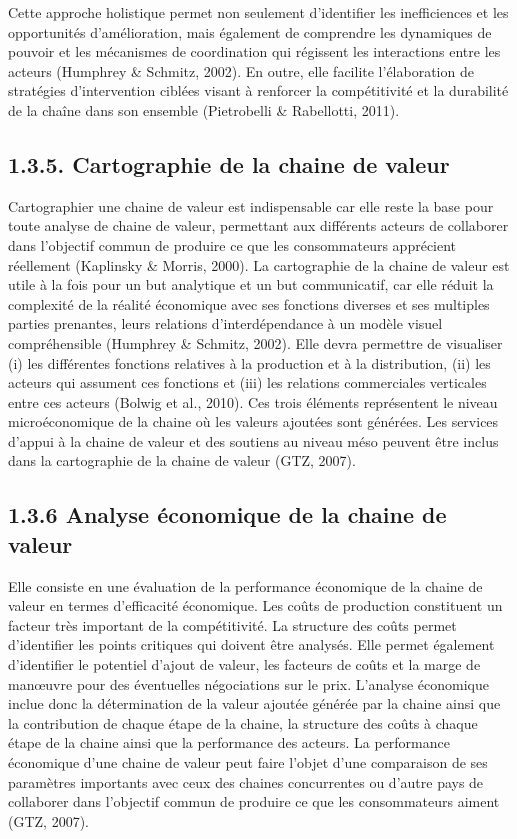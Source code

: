 \documentclass[12pt,oneside]{report}
\begin{document}
Cette approche holistique permet non seulement d'identifier les inefficiences et les opportunités d'amélioration, mais également de comprendre les dynamiques de pouvoir et les mécanismes de coordination qui régissent les interactions entre les acteurs (Humphrey \& Schmitz, 2002). En outre, elle facilite l'élaboration de stratégies d'intervention ciblées visant à renforcer la compétitivité et la durabilité de la chaîne dans son ensemble (Pietrobelli \& Rabellotti, 2011).

\subsection{1.3.5. Cartographie de la chaine de valeur}
Cartographier une chaine de valeur est indispensable car elle reste la base pour toute analyse de chaine de valeur, permettant aux différents acteurs de collaborer dans l'objectif commun de produire ce que les consommateurs apprécient réellement (Kaplinsky \& Morris, 2000). La cartographie de la chaine de valeur est utile à la fois pour un but analytique et un but communicatif, car elle réduit la complexité de la réalité économique avec ses fonctions diverses et ses multiples parties prenantes, leurs relations d'interdépendance à un modèle visuel compréhensible (Humphrey \& Schmitz, 2002). Elle devra permettre de visualiser (i) les différentes fonctions relatives à la production et à la distribution, (ii) les acteurs qui assument ces fonctions et (iii) les relations commerciales verticales entre ces acteurs (Bolwig et al., 2010). Ces trois éléments représentent le niveau microéconomique de la chaine où les valeurs ajoutées sont générées. Les services d'appui à la chaine de valeur et des soutiens au niveau méso peuvent être inclus dans la cartographie de la chaine de valeur (GTZ, 2007).

\subsection{1.3.6 Analyse économique de la chaine de valeur}
Elle consiste en une évaluation de la performance économique de la chaine de valeur en termes d’efficacité économique. Les coûts de production constituent un facteur très important de la compétitivité. La structure des coûts permet d’identifier les points critiques qui doivent être analysés. Elle permet également d’identifier le potentiel d’ajout de valeur, les facteurs de coûts et la marge de manœuvre pour des éventuelles négociations sur le prix. L’analyse économique inclue donc la détermination de la valeur ajoutée générée par la chaine ainsi que la contribution de chaque étape de la chaine, la structure des coûts à chaque étape de la chaine ainsi que la performance des acteurs. La performance économique d’une chaine de valeur peut faire l’objet d’une comparaison de ses paramètres importants avec ceux des chaines concurrentes ou d’autre pays de collaborer dans l’objectif commun de produire ce que les consommateurs aiment (GTZ, 2007).
\end{document}
